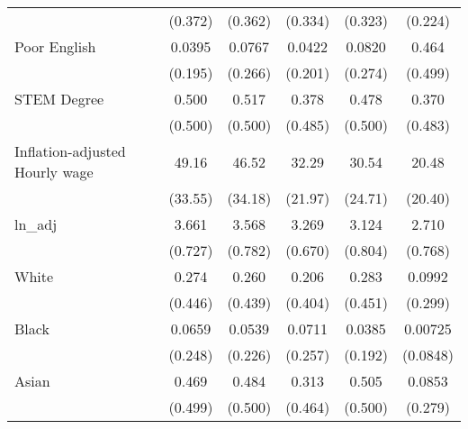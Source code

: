 \begin{table}[htbp]
\begin{tabular}{l*{5}{c}}
                    &     (0.372)         &     (0.362)         &     (0.334)         &     (0.323)         &     (0.224)         \\
[1em]
Poor English        &      0.0395         &      0.0767         &      0.0422         &      0.0820         &       0.464         \\
                    &     (0.195)         &     (0.266)         &     (0.201)         &     (0.274)         &     (0.499)         \\
[1em]
STEM Degree         &       0.500         &       0.517         &       0.378         &       0.478         &       0.370         \\
                    &     (0.500)         &     (0.500)         &     (0.485)         &     (0.500)         &     (0.483)         \\
[1em]
Inflation-adjusted Hourly wage&       49.16         &       46.52         &       32.29         &       30.54         &       20.48         \\
                    &     (33.55)         &     (34.18)         &     (21.97)         &     (24.71)         &     (20.40)         \\
[1em]
ln\_adj              &       3.661         &       3.568         &       3.269         &       3.124         &       2.710         \\
                    &     (0.727)         &     (0.782)         &     (0.670)         &     (0.804)         &     (0.768)         \\
[1em]
White               &       0.274         &       0.260         &       0.206         &       0.283         &      0.0992         \\
                    &     (0.446)         &     (0.439)         &     (0.404)         &     (0.451)         &     (0.299)         \\
[1em]
Black               &      0.0659         &      0.0539         &      0.0711         &      0.0385         &     0.00725         \\
                    &     (0.248)         &     (0.226)         &     (0.257)         &     (0.192)         &    (0.0848)         \\
[1em]
Asian               &       0.469         &       0.484         &       0.313         &       0.505         &      0.0853         \\
                    &     (0.499)         &     (0.500)         &     (0.464)         &     (0.500)         &     (0.279)         \\

\end{tabular}
\end{table}
